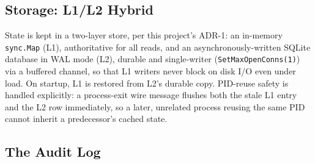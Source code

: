 \documentclass{article}
\begin{document}
\subsection{Storage: L1/L2 Hybrid}
\label{sec:storage}

State is kept in a two-layer store, per this project's ADR-1: an
in-memory \texttt{sync.Map} (L1), authoritative for all reads, and an
asynchronously-written SQLite database in WAL mode (L2), durable and
single-writer (\texttt{SetMaxOpenConns(1)}) via a buffered channel, so
that L1 writers never block on disk I/O even under load. On startup, L1
is restored from L2's durable copy. PID-reuse safety is handled
explicitly: a process-exit wire message flushes both the stale L1 entry
and the L2 row immediately, so a later, unrelated process reusing the
same PID cannot inherit a predecessor's cached state.

\subsection{The Audit Log}
\label{sec:audit-log}
\end{document}
